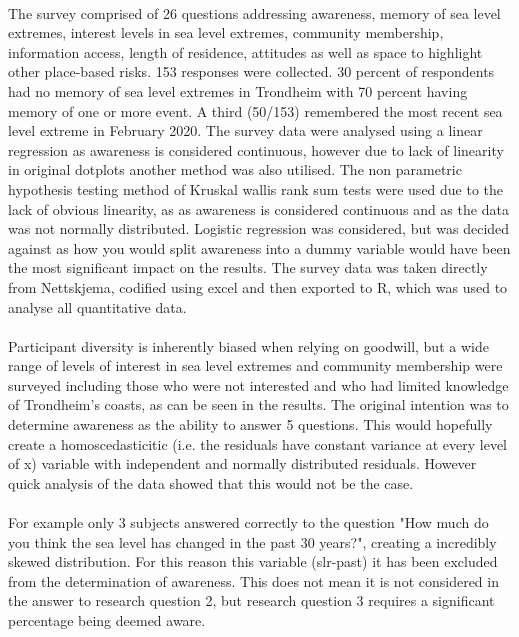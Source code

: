 \paragraph{}
  The survey comprised of 26 questions addressing awareness, memory of sea level extremes, interest levels in sea level extremes, community membership, information access, length of residence, attitudes as well as space to highlight other place-based risks. 153 responses were collected. 30 percent of respondents had no memory of sea level extremes in Trondheim with 70 percent having memory of one or more event. A third (50/153) remembered the most recent sea level extreme in February 2020. The survey data were analysed using a linear regression as awareness is considered continuous, however due to lack of linearity in original dotplots another method was also utilised. The non parametric hypothesis testing method of Kruskal wallis rank sum tests were used due to the lack of obvious linearity, as as awareness is considered continuous and as the data was not normally distributed. Logistic regression was considered, but was decided against as how you would split awareness into a dummy variable would have been the most significant impact on the results. The survey data was taken directly from Nettskjema, codified using excel and then exported to R, which was used to analyse all quantitative data. 
\paragraph{}
  Participant diversity is inherently biased when relying on goodwill, but a wide range of levels of interest in sea level extremes and community membership were surveyed including those who were not interested and who had limited knowledge of Trondheim’s coasts, as can be seen in the results. The original intention was to determine awareness as the ability to answer 5 questions. This would hopefully create a homoscedasticitic (i.e. the residuals have constant variance at every level of x) variable with independent and normally distributed residuals. However quick analysis of the data showed that this would not be the case.
\paragraph{}
  For example only 3 subjects answered correctly to the question "How much do you think the sea level has changed in the past 30 years?", creating a incredibly skewed distribution. For this reason this variable (slr-past) it has been excluded from the determination of awareness. This does not mean it is not considered in the answer to research question 2, but research question 3 requires a significant percentage being deemed aware. 
